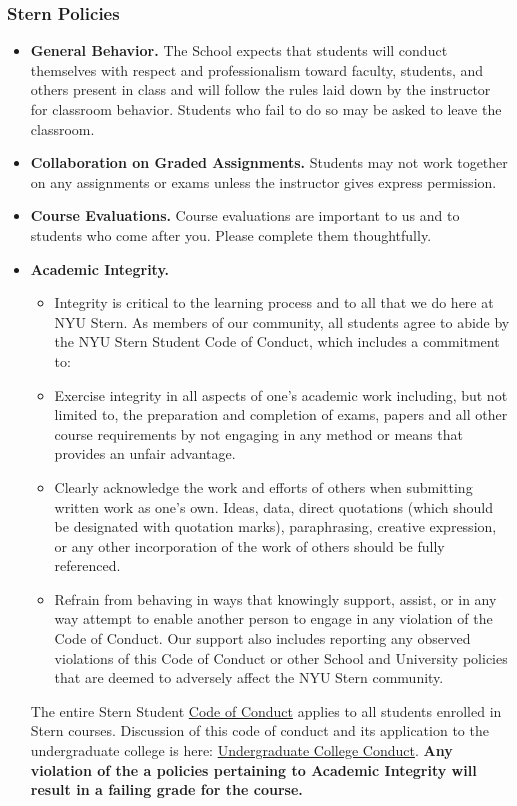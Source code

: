\documentclass[12pt,pdftex,twoside,letterpaper]{exam}
\begin{document}
\subsubsection*{Stern Policies}
\begin{itemize}
\item \textbf{General Behavior.} The School expects that students will conduct themselves with respect and professionalism toward faculty, students, and others present in class and will follow the rules laid down by the instructor for classroom behavior.  Students who fail to do so may be asked to leave the classroom.

\item \textbf{Collaboration on Graded Assignments.} Students may not work together on any assignments or exams unless the instructor gives express permission.

\item \textbf{Course Evaluations.} Course evaluations are important to us and to students who come after you.  Please complete them thoughtfully.

\item \textbf{Academic Integrity.}
\begin{itemize}
\item Integrity is critical to the learning process and to all that we do here at NYU Stern. As members of our community, all students agree to abide by the NYU Stern Student Code of Conduct, which includes a commitment to:
\item Exercise integrity in all aspects of one's academic work including, but not limited to, the preparation and completion of exams, papers and all other course requirements by not engaging in any method or means that provides an unfair advantage.
\item Clearly acknowledge the work and efforts of others when submitting written work as one's own. Ideas, data, direct quotations (which should be designated with quotation marks), paraphrasing, creative expression, or any other incorporation of the work of others should be fully referenced.
\item Refrain from behaving in ways that knowingly support, assist, or in any way attempt to enable another person to engage in any violation of the Code of Conduct. Our support also includes reporting any observed violations of this Code of Conduct or other School and University policies that are deemed to adversely affect the NYU Stern community.
\end{itemize}
The entire Stern Student \href{http://www.stern.nyu.edu/sites/default/files/assets/documents/con_039512.pdf}{Code of Conduct} applies to all students enrolled in Stern courses. Discussion of this code of conduct and its application to the undergraduate college is here: \href{http://www.stern.nyu.edu/uc/codeofconduct}{Undergraduate College Conduct}. \textbf{Any violation of the a policies pertaining to Academic Integrity will result in a failing grade for the course.}
\end{itemize}
\end{document}
